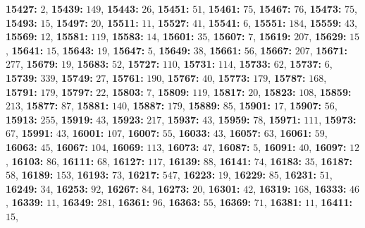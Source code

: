 \textsf{\bfseries 15427:} $2$, \textsf{\bfseries 15439:} $149$, \textsf{\bfseries 15443:} $26$, \textsf{\bfseries 15451:} $51$, \textsf{\bfseries 15461:} $75$, \textsf{\bfseries 15467:} $76$, \textsf{\bfseries 15473:} $75$, \textsf{\bfseries 15493:} $15$, \textsf{\bfseries 15497:} $20$, \textsf{\bfseries 15511:} $11$, \textsf{\bfseries 15527:} $41$, \textsf{\bfseries 15541:} $6$, \textsf{\bfseries 15551:} $184$, \textsf{\bfseries 15559:} $43$, \textsf{\bfseries 15569:} $12$, \textsf{\bfseries 15581:} $119$, \textsf{\bfseries 15583:} $14$, \textsf{\bfseries 15601:} $35$, \textsf{\bfseries 15607:} $7$, \textsf{\bfseries 15619:} $207$, \textsf{\bfseries 15629:} $15$, \textsf{\bfseries 15641:} $15$, \textsf{\bfseries 15643:} $19$, \textsf{\bfseries 15647:} $5$, \textsf{\bfseries 15649:} $38$, \textsf{\bfseries 15661:} $56$, \textsf{\bfseries 15667:} $207$, \textsf{\bfseries 15671:} $277$, \textsf{\bfseries 15679:} $19$, \textsf{\bfseries 15683:} $52$, \textsf{\bfseries 15727:} $110$, \textsf{\bfseries 15731:} $114$, \textsf{\bfseries 15733:} $62$, \textsf{\bfseries 15737:} $6$, \textsf{\bfseries 15739:} $339$, \textsf{\bfseries 15749:} $27$, \textsf{\bfseries 15761:} $190$, \textsf{\bfseries 15767:} $40$, \textsf{\bfseries 15773:} $179$, \textsf{\bfseries 15787:} $168$, \textsf{\bfseries 15791:} $179$, \textsf{\bfseries 15797:} $22$, \textsf{\bfseries 15803:} $7$, \textsf{\bfseries 15809:} $119$, \textsf{\bfseries 15817:} $20$, \textsf{\bfseries 15823:} $108$, \textsf{\bfseries 15859:} $213$, \textsf{\bfseries 15877:} $87$, \textsf{\bfseries 15881:} $140$, \textsf{\bfseries 15887:} $179$, \textsf{\bfseries 15889:} $85$, \textsf{\bfseries 15901:} $17$, \textsf{\bfseries 15907:} $56$, \textsf{\bfseries 15913:} $255$, \textsf{\bfseries 15919:} $43$, \textsf{\bfseries 15923:} $217$, \textsf{\bfseries 15937:} $43$, \textsf{\bfseries 15959:} $78$, \textsf{\bfseries 15971:} $111$, \textsf{\bfseries 15973:} $67$, \textsf{\bfseries 15991:} $43$, \textsf{\bfseries 16001:} $107$, \textsf{\bfseries 16007:} $55$, \textsf{\bfseries 16033:} $43$, \textsf{\bfseries 16057:} $63$, \textsf{\bfseries 16061:} $59$, \textsf{\bfseries 16063:} $45$, \textsf{\bfseries 16067:} $104$, \textsf{\bfseries 16069:} $113$, \textsf{\bfseries 16073:} $47$, \textsf{\bfseries 16087:} $5$, \textsf{\bfseries 16091:} $40$, \textsf{\bfseries 16097:} $12$, \textsf{\bfseries 16103:} $86$, \textsf{\bfseries 16111:} $68$, \textsf{\bfseries 16127:} $117$, \textsf{\bfseries 16139:} $88$, \textsf{\bfseries 16141:} $74$, \textsf{\bfseries 16183:} $35$, \textsf{\bfseries 16187:} $58$, \textsf{\bfseries 16189:} $153$, \textsf{\bfseries 16193:} $73$, \textsf{\bfseries 16217:} $547$, \textsf{\bfseries 16223:} $19$, \textsf{\bfseries 16229:} $85$, \textsf{\bfseries 16231:} $51$, \textsf{\bfseries 16249:} $34$, \textsf{\bfseries 16253:} $92$, \textsf{\bfseries 16267:} $84$, \textsf{\bfseries 16273:} $20$, \textsf{\bfseries 16301:} $42$, \textsf{\bfseries 16319:} $168$, \textsf{\bfseries 16333:} $46$, \textsf{\bfseries 16339:} $11$, \textsf{\bfseries 16349:} $281$, \textsf{\bfseries 16361:} $96$, \textsf{\bfseries 16363:} $55$, \textsf{\bfseries 16369:} $71$, \textsf{\bfseries 16381:} $11$, \textsf{\bfseries 16411:} $15$, 
